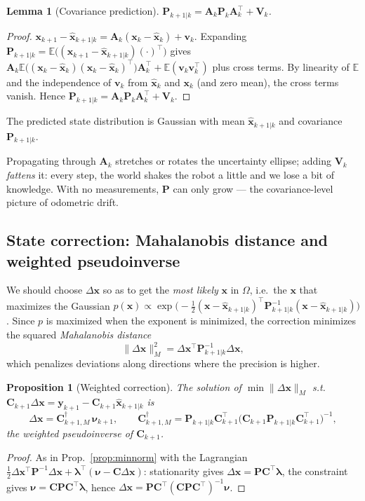 \documentclass[11pt,a4paper]{article}
\newcommand{\hx}{\hat{\boldsymbol{x}}}
\newcommand{\bx}{\boldsymbol{x}}
\newcommand{\by}{\boldsymbol{y}}
\newcommand{\bv}{\boldsymbol{v}}
\newcommand{\bnu}{\boldsymbol{\nu}}
\newcommand{\mA}{\mathbf{A}}
\newcommand{\mC}{\mathbf{C}}
\newcommand{\mP}{\mathbf{P}}
\newcommand{\mV}{\mathbf{V}}
\newcommand{\pinv}{^{\dagger}}
\newcommand{\tp}{^{\top}}
\newcommand{\E}{\mathbb{E}}
\theoremstyle{plain}
\newtheorem{lemma}[theorem]{Lemma}
\newtheorem{proposition}[theorem]{Proposition}
\theoremstyle{definition}
\theoremstyle{remark}
\begin{document}
\begin{lemma}[Covariance prediction]\label{lem:covpred}
$\mP_{k+1|k}=\mA_k\mP_k\mA_k\tp+\mV_k$.
\end{lemma}
\begin{proof}
$\bx_{k+1}-\hx_{k+1|k}=\mA_k(\bx_k-\hx_k)+\bv_k$. Expanding $\mP_{k+1|k}=\E\big((\bx_{k+1}-\hx_{k+1|k})(\cdot)\tp\big)$ gives
$\mA_k\E\big((\bx_k-\hx_k)(\bx_k-\hx_k)\tp\big)\mA_k\tp+\E(\bv_k\bv_k\tp)$ plus cross terms. By linearity of $\E$ and the independence of $\bv_k$
from $\hx_k$ and $\bx_k$ (and zero mean), the cross terms vanish. Hence $\mP_{k+1|k}=\mA_k\mP_k\mA_k\tp+\mV_k$.
\end{proof}

The predicted state distribution is Gaussian with mean $\hx_{k+1|k}$ and covariance $\mP_{k+1|k}$.

\begin{intuition}
Propagating through $\mA_k$ stretches or rotates the uncertainty ellipse; adding $\mV_k$ \emph{fattens} it: every step, the
world shakes the robot a little and we lose a bit of knowledge. With no measurements, $\mP$ can only grow --- the
covariance-level picture of odometric drift.
\end{intuition}

\subsection{State correction: Mahalanobis distance and weighted pseudoinverse}

We should choose $\Delta\bx$ so as to get the \emph{most likely} $\bx$ in $\Omega$, i.e.\ the $\bx$ that maximizes the Gaussian
$p(\bx)\propto\exp\!\big(-\tfrac12(\bx-\hx_{k+1|k})\tp\mP_{k+1|k}^{-1}(\bx-\hx_{k+1|k})\big)$. Since $p$ is maximized when the exponent is
minimized, the correction minimizes the squared \emph{Mahalanobis distance}
\begin{equation}
\|\Delta\bx\|_M^2=\Delta\bx\tp\mP_{k+1|k}^{-1}\Delta\bx ,
\end{equation}
which penalizes deviations along directions where the precision is higher.

\begin{proposition}[Weighted correction]\label{prop:weighted}
The solution of $\min\|\Delta\bx\|_M$ s.t.\ $\mC_{k+1}\Delta\bx=\by_{k+1}-\mC_{k+1}\hx_{k+1|k}$ is
\begin{equation}\label{eq:dxM}
\Delta\bx=\mC_{k+1,M}\pinv\,\bnu_{k+1},\qquad
\mC_{k+1,M}\pinv=\mP_{k+1|k}\mC_{k+1}\tp\big(\mC_{k+1}\mP_{k+1|k}\mC_{k+1}\tp\big)^{-1},
\end{equation}
the \emph{weighted pseudoinverse} of $\mC_{k+1}$.
\end{proposition}
\begin{proof}
As in Prop.~\ref{prop:minnorm} with the Lagrangian $\tfrac12\Delta\bx\tp\mP^{-1}\Delta\bx+\boldsymbol\lambda\tp(\bnu-\mC\Delta\bx)$:
stationarity gives $\Delta\bx=\mP\mC\tp\boldsymbol\lambda$, the constraint gives $\bnu=\mC\mP\mC\tp\boldsymbol\lambda$, hence
$\Delta\bx=\mP\mC\tp(\mC\mP\mC\tp)^{-1}\bnu$.
\end{proof}
\end{document}
